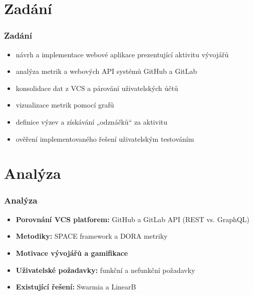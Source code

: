 \documentclass[czech,sage]{ctufit-presentation}
\begin{document}
\begin{frame}[plain,t]
	\titlepage
\end{frame}



\section{Zadání}
\begin{frame}
    \frametitle{Zadání}
    \begin{itemize}
        \item návrh a implementace webové aplikace prezentující aktivitu vývojářů
        \item analýza metrik a webových API systémů GitHub a GitLab
        \item konsolidace dat z VCS a párování uživatelských účtů
        \item vizualizace metrik pomocí grafů
        \item definice výzev a získávání „odznáčků“ za aktivitu
        \item ověření implementovaného řešení uživatelským testováním
    \end{itemize}
\end{frame}

\section{Analýza}
\begin{frame}
    \frametitle{Analýza}
    \begin{itemize}
        \item \textbf{Porovnání VCS platforem:} GitHub a GitLab API (REST vs. GraphQL)
        \item \textbf{Metodiky:} SPACE framework a DORA metriky
        \item \textbf{Motivace vývojářů a gamifikace}
        \item \textbf{Uživatelské požadavky:} funkční a nefunkční požadavky
        \item \textbf{Existující řešení:} Swarmia a LinearB
    \end{itemize}
\end{frame}
\end{document}
